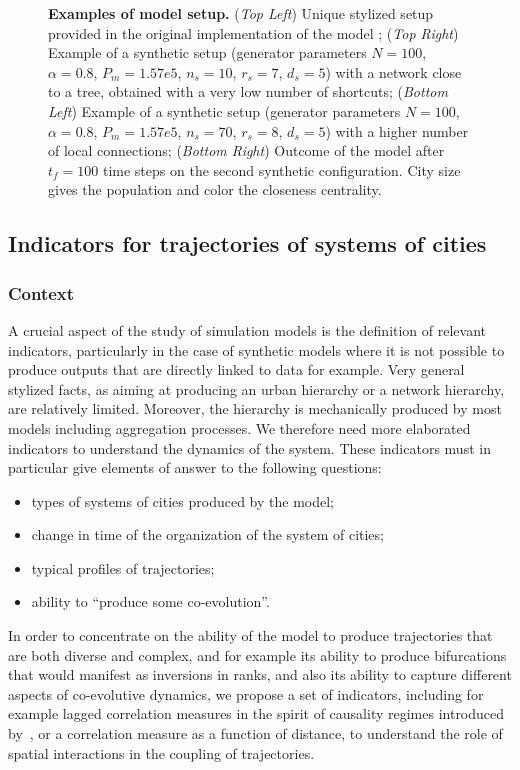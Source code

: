 \documentclass[graybox]{svmult}
\begin{document}
\begin{figure}
	\caption{\textbf{Examples of model setup.} (\textit{Top Left}) Unique stylized setup provided in the original implementation of the model \cite{schmitt2014modelisation}; (\textit{Top Right}) Example of a synthetic setup (generator parameters $N=100$, $\alpha=0.8$, $P_m =1.57e5$, $n_s = 10$, $r_s=7$, $d_s = 5$) with a network close to a tree, obtained with a very low number of shortcuts; (\textit{Bottom Left}) Example of a synthetic setup (generator parameters $N=100$, $\alpha=0.8$, $P_m =1.57e5$, $n_s = 70$, $r_s=8$, $d_s = 5$) with a higher number of local connections; (\textit{Bottom Right}) Outcome of the model after $t_f = 100$ time steps on the second synthetic configuration. City size gives the population and color the closeness centrality.\label{fig:exsetup}}
\end{figure}



\subsection{Indicators for trajectories of systems of cities}

\subsubsection{Context}

A crucial aspect of the study of simulation models is the definition of relevant indicators, particularly in the case of synthetic models where it is not possible to produce outputs that are directly linked to data for example. Very general stylized facts, as aiming at producing an urban hierarchy or a network hierarchy, are relatively limited. Moreover, the hierarchy is mechanically produced by most models including aggregation processes. We therefore need more elaborated indicators to understand the dynamics of the system. These indicators must in particular give elements of answer to the following questions:
\begin{itemize}
	\item types of systems of cities produced by the model;
	\item change in time of the organization of the system of cities;
	\item typical profiles of trajectories;
	\item ability to ``produce some co-evolution''.
\end{itemize}


In order to concentrate on the ability of the model to produce trajectories that are both diverse and complex, and for example its ability to produce bifurcations that would manifest as inversions in ranks, and also its ability to capture different aspects of co-evolutive dynamics, we propose a set of indicators, including for example lagged correlation measures in the spirit of causality regimes introduced by~\cite{raimbault2017identification}, or a correlation measure as a function of distance, to understand the role of spatial interactions in the coupling of trajectories.
\end{document}
